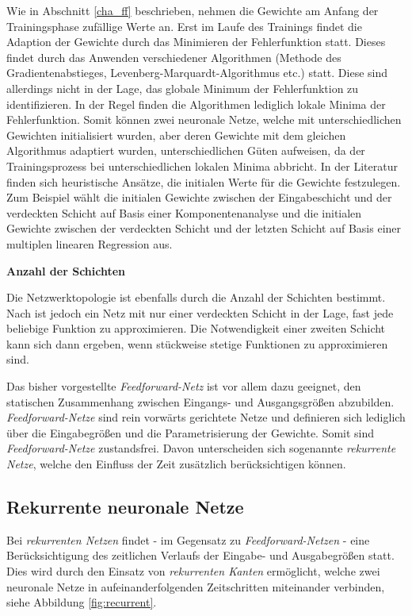 Wie in Abschnitt \ref{cha_ff} beschrieben, nehmen die Gewichte am Anfang der Trainingsphase zufällige Werte an. Erst im Laufe des Trainings findet die Adaption der Gewichte durch das Minimieren der Fehlerfunktion statt. Dieses findet durch das Anwenden verschiedener Algorithmen (Methode des Gradientenabstieges, Levenberg-Marquardt-Algorithmus etc.) statt. Diese sind allerdings nicht in der Lage, das globale Minimum der Fehlerfunktion zu identifizieren. In der Regel finden die Algorithmen lediglich lokale Minima der Fehlerfunktion. Somit können zwei neuronale Netze, welche mit unterschiedlichen Gewichten initialisiert wurden, aber deren Gewichte mit dem gleichen Algorithmus adaptiert wurden, unterschiedlichen Güten aufweisen, da der Trainingsprozess bei unterschiedlichen lokalen Minima abbricht. In der Literatur finden sich heuristische Ansätze, die initialen Werte für die Gewichte festzulegen. Zum Beispiel wählt \cite{Piovoso.1991b} die initialen Gewichte zwischen der Eingabeschicht und der verdeckten Schicht auf Basis einer Komponentenanalyse und die initialen Gewichte zwischen der verdeckten Schicht und der letzten Schicht auf Basis einer multiplen linearen Regression aus. 

\textbf{Anzahl der Schichten}

Die Netzwerktopologie ist ebenfalls durch die Anzahl der Schichten bestimmt. Nach \cite{Hornik.1989} ist jedoch ein Netz mit nur einer verdeckten Schicht in der Lage, fast jede beliebige Funktion zu approximieren. Die Notwendigkeit einer zweiten Schicht kann sich dann ergeben, wenn stückweise stetige Funktionen zu approximieren sind.



Das bisher vorgestellte \textit{Feedforward-Netz} ist vor allem dazu geeignet, den statischen Zusammenhang zwischen Eingangs- und Ausgangsgrößen abzubilden. \textit{Feedforward-Netze} sind rein vorwärts gerichtete Netze und definieren sich lediglich über die Eingabegrößen und die Parametrisierung der Gewichte. Somit sind \textit{Feedforward-Netze} zustandsfrei. Davon unterscheiden sich sogenannte \textit{rekurrente Netze}, welche den Einfluss der Zeit zusätzlich berücksichtigen können. 





\subsection{Rekurrente neuronale Netze}

Bei \textit{rekurrenten Netzen} findet - im Gegensatz zu \textit{Feedforward-Netzen} - eine Berücksichtigung des zeitlichen Verlaufs der Eingabe- und Ausgabegrößen statt. Dies wird durch den Einsatz von \textit{rekurrenten Kanten} ermöglicht, welche zwei neuronale Netze in aufeinanderfolgenden Zeitschritten miteinander verbinden, siehe Abbildung \ref{fig:recurrent}.  

